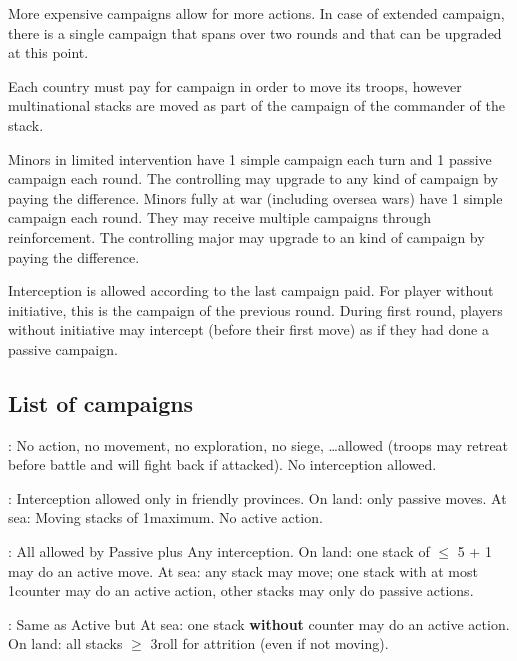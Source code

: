 More expensive campaigns allow for more actions. In case of extended campaign,
there is a single campaign that spans over two rounds and that can be upgraded
at this point.

Each country must pay for campaign in order to move its troops, however
multinational stacks are moved as part of the campaign of the commander of the
stack.

\bparag Minors in limited intervention have 1 simple campaign each turn and 1
passive campaign each round. The controlling \MAJ may upgrade to any kind of
campaign by paying the difference.
\bparag Minors fully at war (including oversea wars) have 1 simple campaign
each round. They may receive multiple campaigns through reinforcement. The
controlling major may upgrade to an kind of campaign by paying the
difference.

 Interception is allowed according to the
last campaign paid.
\bparag For player without initiative, this is the campaign of the previous
round.
\bparag During first round, players without initiative may intercept (before
their first move) as if they had done a passive campaign.

\subsection{List of campaigns}
\ducats: No action, no movement, no exploration, no siege,
\ldots allowed (troops may retreat before battle and will fight back if
attacked). No interception allowed.

\ducats:
\bparag Interception allowed only in friendly provinces.
\bparag On land: only passive moves.
\bparag At sea: Moving stacks of 1\FLEET maximum. No active action.

\ducats: All allowed by Passive plus
\bparag Any interception.
\bparag On land: one stack of $\leq$ 5 \LD + 1 \Pasha may do an active move.
\bparag At sea: any stack may move; one stack with at most 1\FLEET counter
may do an active action, other stacks may only do passive actions.

\ducats: Same as Active but
\bparag At sea: one stack \textbf{without} \FLEET counter may do an active
action.
\bparag On land: all stacks $\geq$ 3\LD roll for attrition (even if not
moving).

